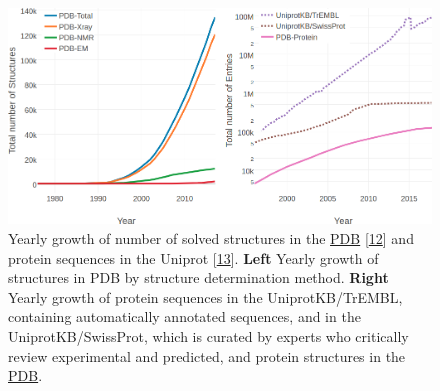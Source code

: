 \documentclass[11pt,a4paper,twoside]{book}
\theoremstyle{definition}
\theoremstyle{definition}
\theoremstyle{remark}
\begin{document}
\begin{figure}
\includegraphics[width=1\linewidth]{img/intro/pdb_uniprot_stats} \caption{Yearly growth of number of solved structures
in the \protect\hyperlink{abbrev}{PDB}
{[}\protect\hyperlink{ref-Berman2000}{12}{]} and protein sequences in
the Uniprot {[}\protect\hyperlink{ref-TheUniProtConsortium2017}{13}{]}.
\textbf{Left} Yearly growth of structures in PDB by structure
determination method. \textbf{Right} Yearly growth of protein sequences
in the UniprotKB/TrEMBL, containing automatically annotated sequences,
and in the UniprotKB/SwissProt, which is curated by experts who
critically review experimental and predicted, and protein structures in
the \protect\hyperlink{abbrev}{PDB}.}\label{fig:seq-str-gap}
\end{figure}
\end{document}
